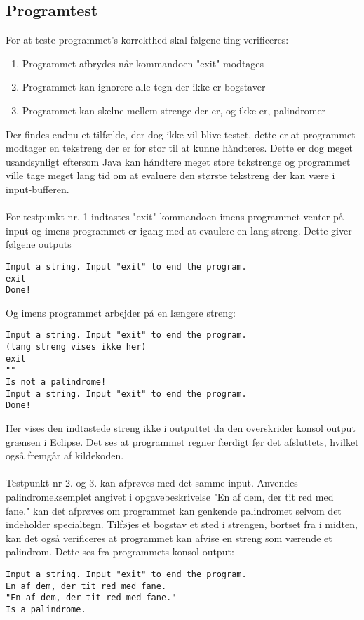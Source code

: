 \subsection{Programtest}
	For at teste programmet's korrekthed skal følgene ting verificeres:
	\begin{enumerate}
		\item Programmet afbrydes når kommandoen "exit" modtages
		\item Programmet kan ignorere alle tegn der ikke er bogstaver
		\item Programmet kan skelne mellem strenge der er, og ikke er, palindromer
	\end{enumerate}
	Der findes endnu et tilfælde, der dog ikke vil blive testet, dette er at programmet modtager en tekstreng der er for stor til at kunne håndteres. Dette er dog meget usandsynligt eftersom Java kan håndtere meget store tekstrenge og programmet ville tage meget lang tid om at evaluere den største tekstreng der kan være i input-bufferen. \\
	\\
	For testpunkt nr. 1 indtastes "exit" kommandoen imens programmet venter på input og imens programmet er igang med at evaulere en lang streng. Dette giver følgene outputs
	\begin{lstlisting}[caption=Output fra testsekvens]
Input a string. Input "exit" to end the program.
exit
Done!
	\end{lstlisting}
	Og imens programmet arbejder på en længere streng:
	\begin{lstlisting}[caption=Output fra testsekvens imens programmet evaluerer]
Input a string. Input "exit" to end the program.
(lang streng vises ikke her)
exit
""
Is not a palindrome!
Input a string. Input "exit" to end the program.
Done!
	\end{lstlisting}
	Her vises den indtastede streng ikke i outputtet da den overskrider konsol output grænsen i Eclipse. Det ses at programmet regner færdigt før det afsluttets, hvilket også fremgår af kildekoden.\\
	\\
	Testpunkt nr 2. og 3. kan afprøves med det samme input. Anvendes palindromeksemplet angivet i opgavebeskrivelse "En af dem, der tit red med fane." kan det afprøves om programmet kan genkende palindromet selvom det indeholder specialtegn. Tilføjes et bogstav et sted i strengen, bortset fra i midten, kan det også verificeres at programmet kan afvise en streng som værende et palindrom. Dette ses fra programmets konsol output:
	\begin{lstlisting}[caption=Genkendelse af palindrom]
Input a string. Input "exit" to end the program.
En af dem, der tit red med fane.
"En af dem, der tit red med fane."
Is a palindrome.
	\end{lstlisting}

